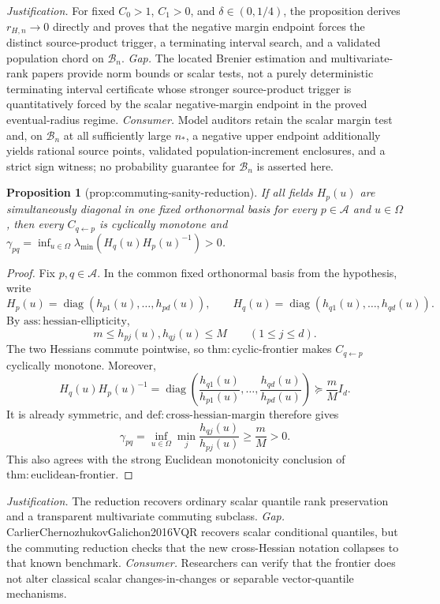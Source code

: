 \documentclass{article}
\newtheorem{proposition}{Proposition}
\begin{document}
\par\smallskip\noindent \textit{Justification.} For fixed \(C_0>1\), \(C_1>0\), and \(\delta\in(0,1/4)\), the proposition derives \(r_{H,n}\to0\) directly and proves that the negative margin endpoint forces the distinct source-product trigger, a terminating interval search, and a validated population chord on \(\mathcal B_n\). \textit{Gap.} The located Brenier estimation and multivariate-rank papers provide norm bounds or scalar tests, not a purely deterministic terminating interval certificate whose stronger source-product trigger is quantitatively forced by the scalar negative-margin endpoint in the proved eventual-radius regime. \textit{Consumer.} Model auditors retain the scalar margin test and, on \(\mathcal B_n\) at all sufficiently large \(n_\ast\), a negative upper endpoint additionally yields rational source points, validated population-increment enclosures, and a strict sign witness; no probability guarantee for \(\mathcal B_n\) is asserted here.

\begin{proposition}[prop:commuting-sanity-reduction]\label{prop:commuting-sanity-reduction}
If all fields \(H_p(u)\) are simultaneously diagonal in one fixed orthonormal basis for every \(p\in\mathcal A\) and \(u\in\Omega\), then every \(C_{q\leftarrow p}\) is cyclically monotone and \(\gamma_{pq}=\inf_{u\in\Omega}\lambda_{\min}(H_q(u)H_p(u)^{-1})>0\).
\end{proposition}
\begin{proof}
Fix \(p,q\in\mathcal A\).  In the common fixed orthonormal basis from the hypothesis, write
\[
 H_p(u)=\operatorname{diag}(h_{p1}(u),\ldots,h_{pd}(u)),
 \qquad
 H_q(u)=\operatorname{diag}(h_{q1}(u),\ldots,h_{qd}(u)).
\]
By \(\mathrm{ass:hessian\text{-}ellipticity}\),
\[
 m\le h_{pj}(u),h_{qj}(u)\le M
 \qquad(1\le j\le d).
\]
The two Hessians commute pointwise, so \(\mathrm{thm:cyclic\text{-}frontier}\) makes \(C_{q\leftarrow p}\) cyclically monotone.  Moreover,
\[
 H_q(u)H_p(u)^{-1}
 =\operatorname{diag}\!\left(\frac{h_{q1}(u)}{h_{p1}(u)},\ldots,
 \frac{h_{qd}(u)}{h_{pd}(u)}\right)
 \succeq\frac mM I_d.
\]
It is already symmetric, and \(\mathrm{def:cross\text{-}hessian\text{-}margin}\) therefore gives
\[
 \gamma_{pq}
 =\inf_{u\in\Omega}\min_j\frac{h_{qj}(u)}{h_{pj}(u)}
 \ge\frac mM>0.
\]
This also agrees with the strong Euclidean monotonicity conclusion of \(\mathrm{thm:euclidean\text{-}frontier}\).
\end{proof}
\par\smallskip\noindent \textit{Justification.} The reduction recovers ordinary scalar quantile rank preservation and a transparent multivariate commuting subclass. \textit{Gap.} CarlierChernozhukovGalichon2016VQR recovers scalar conditional quantiles, but the commuting reduction checks that the new cross-Hessian notation collapses to that known benchmark. \textit{Consumer.} Researchers can verify that the frontier does not alter classical scalar changes-in-changes or separable vector-quantile mechanisms.
\end{document}
